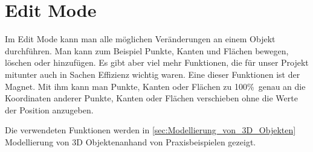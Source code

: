 \section{Edit Mode}
Im Edit Mode kann man alle möglichen Veränderungen an einem Objekt durchführen. Man kann zum Beispiel Punkte, Kanten und Flächen bewegen, löschen oder hinzufügen.
Es gibt aber viel mehr Funktionen, die für unser Projekt mitunter auch in Sachen Effizienz wichtig waren. Eine dieser Funktionen ist der Magnet. Mit ihm kann man Punkte, Kanten oder Flächen zu 100\%\ genau an
die Koordinaten anderer Punkte, Kanten oder Flächen verschieben ohne die Werte der Position anzugeben.

Die verwendeten Funktionen werden in \autoref{sec:Modellierung_von_3D_Objekten} \dq  Modellierung von 3D Objekten\dq anhand von
Praxisbeispielen gezeigt.
